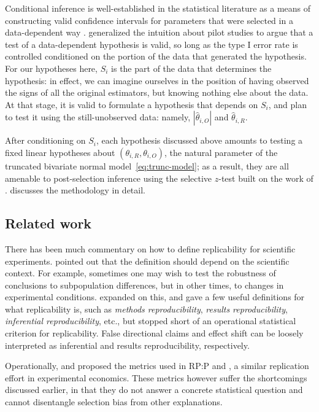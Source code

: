 \documentclass[aoas, preprint]{imsart}
\theoremstyle{definition}
\theoremstyle{custom}
\newcommand{\htheta}{\hat{\theta}}
\begin{document}
  Conditional inference is well-established in the statistical literature as a means of constructing valid confidence intervals for parameters that were selected in a data-dependent way \citep[e.g.][]{Sampson:2005,Zollner:2007,Weinstein:2013,Yekutieli:2012}. \citet{Fithian:2014ws} generalized the intuition about pilot studies to argue that a test of a data-dependent hypothesis is valid, so long as the type I error rate is controlled conditioned on the portion of the data that generated the hypothesis. For our hypotheses here, $S_i$ is the part of the data that determines the hypothesis: in effect, we can imagine ourselves in the position of having observed the signs of all the original estimators, but knowing nothing else about the data. At that stage, it is valid to formulate a hypothesis that depends on $S_i$, and plan to test it using the still-unobserved data: namely, $|\htheta_{i,O}|$ and $\htheta_{i,R}$.

  After conditioning on $S_i$, each hypothesis discussed above amounts to testing a fixed linear hypotheses about $(\theta_{i,R}, \theta_{i,O})$, the natural parameter of the truncated bivariate normal model~\eqref{eq:trunc-model}; as a result, they are all amenable to post-selection inference using the selective $z$-test built on the work of \citet{Lee:2016fv}.  discusses the methodology in detail.

\subsection{Related work}

  There has been much commentary on how to define replicability for scientific experiments. \citet{Valentine:2011ga} pointed out that the definition should depend on the scientific context. For example, sometimes one may wish to test the robustness of conclusions to subpopulation differences, but in other times, to changes in experimental conditions. \citet{Goodman:2016bo} expanded on this, and gave a few useful definitions for what replicability is, such as {\em methods reproducibility}, {\em results reproducibility}, {\em inferential reproducibility}, etc., but stopped short of an operational statistical criterion for replicability. False directional claims and effect shift can be loosely interpreted as inferential and results reproducibility, respectively.

  Operationally, \citet{Valentine:2011ga} and \citet{Nosek:2017ei} proposed the metrics used in RP:P and \citet{Camerer:2018de}, a similar replication effort in experimental economics. These metrics however suffer the shortcomings discussed earlier, in that they do not answer a concrete statistical question and cannot disentangle selection bias from other explanations.
\end{document}

